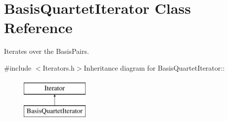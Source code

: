\hypertarget{classJKBuilder_1_1BasisQuartetIterator}{
\section{BasisQuartetIterator Class Reference}
\label{classJKBuilder_1_1BasisQuartetIterator}
}


Iterates over the BasisPairs.  


{\ttfamily \#include $<$Iterators.h$>$}Inheritance diagram for BasisQuartetIterator::\begin{figure}[H]
\begin{center}
\leavevmode
\includegraphics[height=2cm]{classJKBuilder_1_1BasisQuartetIterator}
\end{center}
\end{figure}
